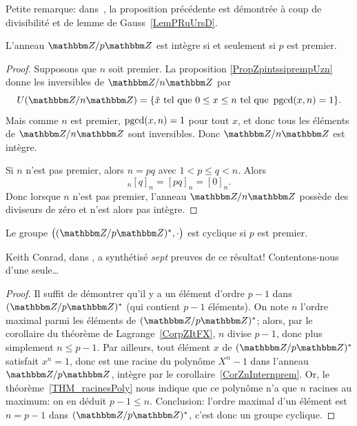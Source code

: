 Petite remarque: dans~\cite{BIBooFOGTooQgFAbQ}, la proposition précédente est démontrée à coup de divisibilité et de lemme de Gauss~\ref{LemPRuUrsD}.


\begin{corollary}   \label{CorZnInternprem}
    L'anneau \( \eZ/p\eZ\) est intègre si et seulement si \( p\) est premier.
\end{corollary}

\begin{proof}
    Supposons que \( n\) soit premier. La proposition \ref{PropZpintssiprempUzn} donne les inversibles de \( \eZ/n\eZ\) par
    \begin{equation}
        U(\eZ/n\eZ)=\{ \tilde x\tq 0\leq x\leq n\tq\pgcd(x,n)=1 \}.
    \end{equation}
    Mais comme \( n\) est premier, \( \operatorname{pgcd}(x,n)=1\) pour tout \( x\), et donc tous les éléments de \( \eZ/n\eZ\) sont inversibles. Donc \( \eZ/n\eZ\) est intègre.

    Si \( n\) n'est pas premier, alors \( n=pq\) avec \( 1<p\leq q<n\). Alors
    \begin{equation}
        [p]_n[q]_n=[pq]_n=[0]_n.
    \end{equation}
    Donc lorsque \( n\) n'est pas premier,  l'anneau \( \eZ/n\eZ\) possède des diviseurs de zéro et n'est alors pas intègre.
\end{proof}

\begin{proposition}       \label{PROPooKSCRooPyInSv}
    Le groupe \( \big( (\eZ/p\eZ)^*, \cdot\big)\) est cyclique si \( p \) est premier.
\end{proposition}

Keith Conrad, dans \cite{BIBooYOLUooOAUbYH}, a synthétisé \emph{sept} preuves de ce résultat! Contentons-nous d'une seule\dots

\begin{proof}
  Il suffit de démontrer qu'il y a un élément d'ordre \( p - 1 \) dans \( (\eZ/p\eZ)^* \) (qui contient \( p-1 \) éléments). On note \( n \) l'ordre maximal parmi les éléments de \( (\eZ/p\eZ)^* \); alors, par le corollaire du théorème de Lagrange~\ref{CorpZItFX}, \(n \) divise \( p - 1 \), donc plus simplement \( n \leq p - 1 \). Par ailleurs, tout élément \( x \) de \( (\eZ/p\eZ)^* \) satisfait \( x^n = 1 \), donc est une racine du polynôme \( X^n - 1 \) dans l'anneau \( \eZ/p\eZ \), intègre par le corollaire~\ref{CorZnInternprem}. Or, le théorème~\ref{THM_racinesPoly} nous indique que ce polynôme n'a que \( n \) racines au maximum: on en déduit \( p - 1 \leq n \). Conclusion: l'ordre maximal d'un élément est \( n = p - 1 \) dans \( (\eZ/p\eZ)^* \), c'est donc un groupe cyclique.
\end{proof}

